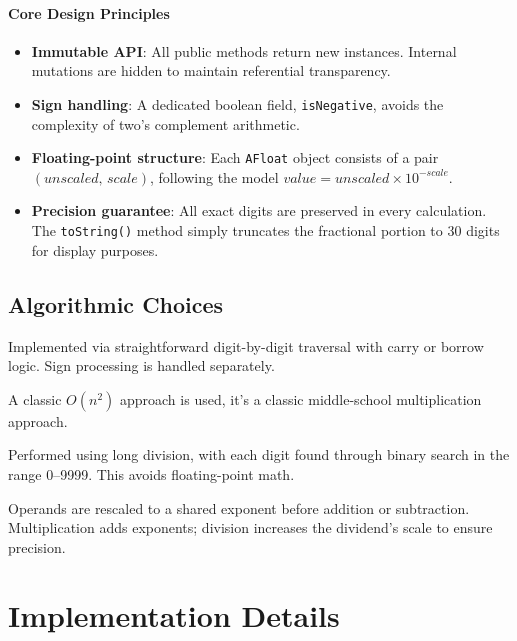 \documentclass[12pt]{article}
\begin{document}
\paragraph{Core Design Principles}
\begin{itemize}
  \item \textbf{Immutable API}: All public methods return new instances. Internal mutations are hidden to maintain referential transparency.
  \item \textbf{Sign handling}: A dedicated boolean field, \texttt{isNegative}, avoids the complexity of two’s complement arithmetic.
  \item \textbf{Floating-point structure}: Each \texttt{AFloat} object consists of a pair \((\textit{unscaled},\,\textit{scale})\), following the model $\textit{value}=\textit{unscaled}\times10^{-\textit{scale}}$.
  \item \textbf{Precision guarantee}: All exact digits are preserved in every calculation. The \texttt{toString()} method simply truncates the fractional portion to 30 digits for display purposes.
\end{itemize}

\subsection{Algorithmic Choices}
\begin{description}[style=nextline]
  \item[Addition / Subtraction] Implemented via straightforward digit-by-digit traversal with carry or borrow logic. Sign processing is handled separately.
  \item[Multiplication] A classic \(O(n^2)\) approach is used, it's a classic middle-school multiplication approach.
  \item[Division] Performed using long division, with each digit found through binary search in the range 0–9999. This avoids floating-point math.
  \item[Floating-point Operations] Operands are rescaled to a shared exponent before addition or subtraction. Multiplication adds exponents; division increases the dividend's scale to ensure precision.
\end{description}

\section{Implementation Details}
\end{document}
